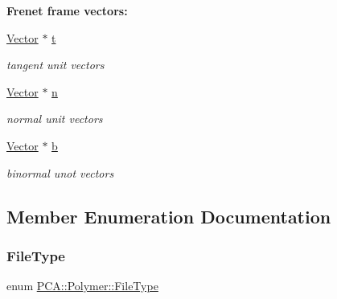 \begin{Indent}{\bf Frenet frame vectors\+:}\par
\begin{DoxyCompactItemize}
\item 
\hyperlink{class_p_c_a_1_1_vector}{Vector} $\ast$ \hyperlink{class_p_c_a_1_1_polymer_a0fd79e19a8c09a9e4c72903924151b5e}{t}
\begin{DoxyCompactList}\small\item\em tangent unit vectors \end{DoxyCompactList}\item 
\hyperlink{class_p_c_a_1_1_vector}{Vector} $\ast$ \hyperlink{class_p_c_a_1_1_polymer_a7c71d8f5516ae0b0ead3929296135d1b}{n}
\begin{DoxyCompactList}\small\item\em normal unit vectors \end{DoxyCompactList}\item 
\hyperlink{class_p_c_a_1_1_vector}{Vector} $\ast$ \hyperlink{class_p_c_a_1_1_polymer_ad93199b0187ab557476153b204b921c7}{b}
\begin{DoxyCompactList}\small\item\em binormal unot vectors \end{DoxyCompactList}\end{DoxyCompactItemize}
\end{Indent}


\subsection{Member Enumeration Documentation}
\hypertarget{class_p_c_a_1_1_polymer_a1df36a764fbf04ccd5cbe8edb49d43bd}{}\label{class_p_c_a_1_1_polymer_a1df36a764fbf04ccd5cbe8edb49d43bd} 
\subsubsection{\texorpdfstring{File\+Type}{FileType}}
{\footnotesize\ttfamily enum \hyperlink{class_p_c_a_1_1_polymer_a1df36a764fbf04ccd5cbe8edb49d43bd}{P\+C\+A\+::\+Polymer\+::\+File\+Type}\hspace{0.3cm}{\ttfamily [strong]}}

